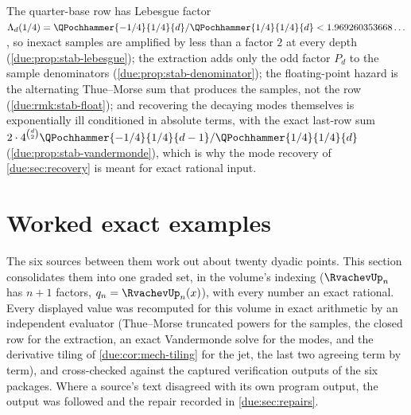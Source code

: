 \documentclass[11pt,oneside]{article}
\theoremstyle{plain}
\theoremstyle{definition}
\theoremstyle{remark}
\newcommand{\upn}[1]{\RvachevUp_{#1}}
\newcommand{\qn}[1]{q_{#1}}                                 %
\begin{document}
\begin{summarybox}[title={Section summary}]
The quarter-base row has Lebesgue factor
$\Lambda_{d}(1/4)=\QPochhammer{-1/4}{1/4}{d}/\QPochhammer{1/4}{1/4}{d}
<1.969260353668\ldots$, so inexact samples are amplified by less than a
factor $2$ at every depth (\cref{due:prop:stab-lebesgue}); the extraction
adds only the odd factor $P_{d}$ to the sample denominators
(\cref{due:prop:stab-denominator}); the floating-point hazard is the
alternating Thue--Morse sum that produces the samples, not the row
(\cref{due:rmk:stab-float}); and recovering the decaying modes themselves is
exponentially ill conditioned in absolute terms, with the exact last-row sum
$2\cdot4^{\binom d2}\QPochhammer{-1/4}{1/4}{d-1}/\QPochhammer{1/4}{1/4}{d}$
(\cref{due:prop:stab-vandermonde}), which is why the mode recovery of
\cref{due:sec:recovery} is meant for exact rational input.
\end{summarybox}


\section{Worked exact examples}
\label{due:sec:examples}

The six sources between them work out about twenty dyadic points.  This
section consolidates them into one graded set, in the volume's indexing
($\upn{n}$ has $n+1$ factors, $\qn{n}=\upn{n}(x)$), with every number an
exact rational.  Every displayed value was recomputed for this volume in
exact arithmetic by an independent evaluator (Thue--Morse truncated powers
for the samples, the closed row for the extraction, an exact Vandermonde
solve for the modes, and the derivative tiling of \cref{due:cor:mech-tiling}
for the jet, the last two agreeing term by term), and cross-checked
against the captured verification outputs of the six packages.  Where a
source's text disagreed with its own program output, the output was
followed and the repair recorded in \cref{due:sec:repairs}.
\end{document}
